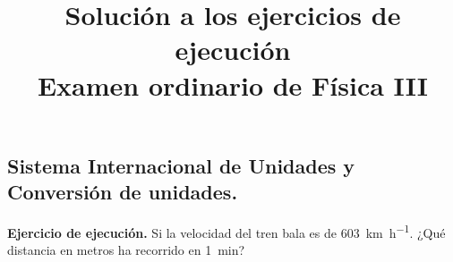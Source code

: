 \documentclass[12pt, letter]{exam}
\date{}
\title{Solución a los ejercicios de ejecución \\ Examen ordinario de Física III}
\begin{document}
\maketitle

\setcounter{page}{2}

\begin{questions}
    \section{Sistema Internacional de Unidades y Conversión de unidades.}
    \setcounter{question}{2} \question \textbf{Ejercicio de ejecución.} Si la velocidad del tren bala es de \SI{603}{\kilo\meter\per\hour}. ¿Qué distancia en metros ha recorrido en \SI{1}{\minute}?
    

\end{questions}
\end{document}
